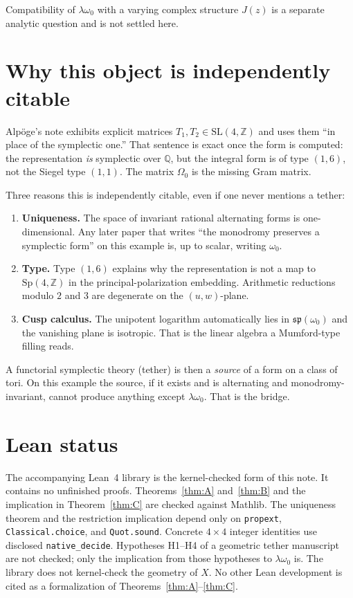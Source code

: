 \documentclass[11pt,a4paper]{article}
\theoremstyle{definition}
\theoremstyle{remark}
\newcommand{\Q}{\mathbb{Q}}
\newcommand{\Z}{\mathbb{Z}}
\newcommand{\spq}{\mathfrak{sp}}
\begin{document}
Compatibility of $\lambda\omega_0$ with a varying complex structure $J(z)$ is a separate analytic question and is not settled here.

\section{Why this object is independently citable}

Alp\"oge's note exhibits explicit matrices $T_1,T_2\in\mathrm{SL}(4,\Z)$ and uses them ``in place of the symplectic one.'' That sentence is exact once the form is computed: the representation \emph{is} symplectic over $\Q$, but the integral form is of type $(1,6)$, not the Siegel type $(1,1)$. The matrix $\Omega_0$ is the missing Gram matrix.

Three reasons this is independently citable, even if one never mentions a tether:

\begin{enumerate}
\item \textbf{Uniqueness.} The space of invariant rational alternating forms is one-dimensional. Any later paper that writes ``the monodromy preserves a symplectic form'' on this example is, up to scalar, writing $\omega_0$.
\item \textbf{Type.} Type $(1,6)$ explains why the representation is not a map to $\mathrm{Sp}(4,\Z)$ in the principal-polarization embedding. Arithmetic reductions modulo $2$ and $3$ are degenerate on the $(u,w)$-plane.
\item \textbf{Cusp calculus.} The unipotent logarithm automatically lies in $\spq(\omega_0)$ and the vanishing plane is isotropic. That is the linear algebra a Mumford-type filling reads.
\end{enumerate}

A functorial symplectic theory (tether) is then a \emph{source} of a form on a class of tori. On this example the source, if it exists and is alternating and monodromy-invariant, cannot produce anything except $\lambda\omega_0$. That is the bridge.

\section{Lean status}

The accompanying Lean~4 library is the kernel-checked form of this note. It contains no unfinished proofs. Theorems~\ref{thm:A} and~\ref{thm:B} and the implication in Theorem~\ref{thm:C} are checked against Mathlib. The uniqueness theorem and the restriction implication depend only on \texttt{propext}, \texttt{Classical.choice}, and \texttt{Quot.sound}. Concrete $4\times 4$ integer identities use disclosed \texttt{native\_decide}. Hypotheses H1--H4 of a geometric tether manuscript are not checked; only the implication from those hypotheses to $\lambda\omega_0$ is. The library does not kernel-check the geometry of $X$. No other Lean development is cited as a formalization of Theorems~\ref{thm:A}--\ref{thm:C}.
\end{document}
